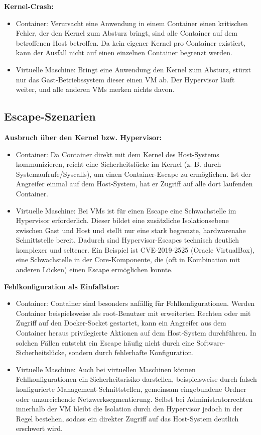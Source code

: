 \documentclass[conference]{IEEEtran}
\begin{document}
\textbf{Kernel-Crash:}
\begin{itemize}
    \item Container: 
    Verursacht eine Anwendung in einem Container einen kritischen Fehler, der den Kernel zum Absturz bringt, sind alle Container auf dem betroffenen Host betroffen. 
    Da kein eigener Kernel pro Container existiert, kann der Ausfall nicht auf einen einzelnen Container begrenzt werden.
    \item Virtuelle Maschine: 
    Bringt eine Anwendung den Kernel zum Absturz, stürzt nur das Gast-Betriebssystem dieser einen VM ab. 
    Der Hypervisor läuft weiter, und alle anderen VMs merken nichts davon.
\end{itemize}
 
 
\subsection{Escape-Szenarien}
\textbf{Ausbruch über den Kernel bzw. Hypervisor:}
\begin{itemize}
    \item Container: 
    Da Container direkt mit dem Kernel des Host-Systems kommunizieren, reicht eine Sicherheitslücke im Kernel (z. B. durch Systemaufrufe/Syscalls), um einen Container-Escape zu ermöglichen. 
    Ist der Angreifer einmal auf dem Host-System, hat er Zugriff auf alle dort laufenden Container.
    \item Virtuelle Maschine: 
    Bei VMs ist für einen Escape eine Schwachstelle im Hypervisor erforderlich. 
    Dieser bildet eine zusätzliche Isolationsebene zwischen Gast und Host und stellt nur eine stark begrenzte, hardwarenahe Schnittstelle bereit. 
    Dadurch sind Hypervisor-Escapes technisch deutlich komplexer und seltener. 
    Ein Beispiel ist CVE-2019-2525 (Oracle VirtualBox), eine Schwachstelle in der Core-Komponente, die (oft in Kombination mit anderen Lücken) einen Escape ermöglichen konnte. 
\end{itemize}
 
\textbf{Fehlkonfiguration als Einfallstor:}
\begin{itemize}
    \item Container: 
    Container sind besonders anfällig für Fehlkonfigurationen. 
    Werden Container beispielsweise als root-Benutzer mit erweiterten Rechten oder mit Zugriff auf den Docker-Socket gestartet, kann ein Angreifer aus dem Container heraus privilegierte Aktionen auf dem Host-System durchführen. 
    In solchen Fällen entsteht ein Escape häufig nicht durch eine Software-Sicherheitslücke, sondern durch fehlerhafte Konfiguration.
    \item Virtuelle Maschine:
    Auch bei virtuellen Maschinen können Fehlkonfigurationen ein Sicherheitsrisiko darstellen, beispielsweise durch falsch konfigurierte Management-Schnittstellen, gemeinsam eingebundene Ordner oder unzureichende Netzwerksegmentierung. 
    Selbst bei Administratorrechten innerhalb der VM bleibt die Isolation durch den Hypervisor jedoch in der Regel bestehen, sodass ein direkter Zugriff auf das Host-System deutlich erschwert wird.
\end{itemize}
 
\end{document}
